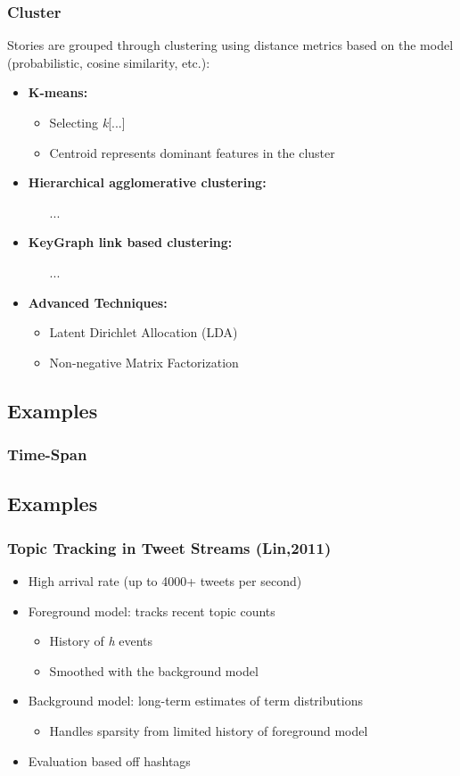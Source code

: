 \documentclass{beamer}
\begin{document}
\begin{frame}
\frametitle{Cluster}
Stories are grouped through clustering using distance metrics based on the
model (probabilistic, cosine similarity, etc.):
\begin{itemize}
	\item {\bf K-means:}
		\begin{itemize}
			\item Selecting \emph{k}[...] 
			\item Centroid represents dominant features in the cluster
		\end{itemize}
	\item {\bf Hierarchical agglomerative clustering:}
		\begin{itemize}
			\item[...]
		\end{itemize}
	\item {\bf KeyGraph link based clustering:}
		\begin{itemize}
			\item[...]
		\end{itemize}
	\item {\bf Advanced Techniques:}
		\begin{itemize}
			\item Latent Dirichlet Allocation (LDA)
			\item Non-negative Matrix Factorization
		\end{itemize}
\end{itemize}
\end{frame}

\subsection{Examples}
\begin{frame}
\frametitle{Time-Span}
\end{frame}

\subsection{Examples}
\begin{frame}
\frametitle{Topic Tracking in Tweet Streams (Lin,2011)}
\begin{itemize}
\item High arrival rate (up to 4000+ tweets per second)
\item Foreground model: tracks recent topic counts
\begin{itemize}
\item History of \emph{h} events
\item Smoothed with the background model
\end{itemize}
\item Background model: long-term estimates of term distributions
\begin{itemize}
\item Handles sparsity from limited history of foreground model
\end{itemize}
\item Evaluation based off hashtags
\end{itemize}
\end{frame}
\end{document}
